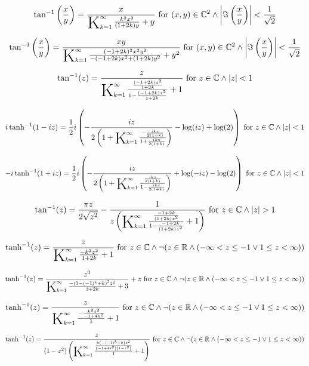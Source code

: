 \documentclass{article}
\newcommand{\bigK}{\mathop{\raisebox{-5pt}{\huge K}}}
\begin{document}
\[\tan ^{-1}\left(\frac{x}{y}\right)=\frac{x}{\bigK_{k=1}^{\infty}\frac{k^2 x^2}{(1+2 k) y}+y}\text{ for }(x,y)\in \mathbb{C}^2\land \left| \Im\left(\frac{x}{y}\right)\right| <\frac{1}{\sqrt{2}}\] 

\[\tan ^{-1}\left(\frac{x}{y}\right)=\frac{x y}{\bigK_{k=1}^{\infty}\frac{(-1+2 k)^2 x^2 y^2}{-(-1+2 k) x^2+(1+2 k) y^2}+y^2}\text{ for }(x,y)\in \mathbb{C}^2\land \left| \Im\left(\frac{x}{y}\right)\right| <\frac{1}{\sqrt{2}}\] 

\[\tan ^{-1}(z)=\frac{z}{\bigK_{k=1}^{\infty}\frac{\frac{(-1+2 k) z^2}{1+2 k}}{1-\frac{(-1+2 k) z^2}{1+2 k}}+1}\text{ for }z\in \mathbb{C}\land \left| z\right| <1\] 

\[i \tanh ^{-1}(1-i z)=\frac{1}{2} i \left(-\frac{i z}{2 \left(1+\bigK_{k=1}^{\infty}\frac{-\frac{i k z}{2 (1+k)}}{1+\frac{i k z}{2 (1+k)}}\right)}-\log (i z)+\log (2)\right)\text{ for }z\in \mathbb{C}\land \left| z\right| <1\] 

\[-i \tanh ^{-1}(1+i z)=\frac{1}{2} i \left(-\frac{i z}{2 \left(1+\bigK_{k=1}^{\infty}\frac{\frac{i k z}{2 (1+k)}}{1-\frac{i k z}{2 (1+k)}}\right)}+\log (-i z)-\log (2)\right)\text{ for }z\in \mathbb{C}\land \left| z\right| <1\] 

\[\tan ^{-1}(z)=\frac{\pi  z}{2 \sqrt{z^2}}-\frac{1}{z \left(\bigK_{k=1}^{\infty}\frac{\frac{-1+2 k}{(1+2 k) z^2}}{1-\frac{-1+2 k}{(1+2 k) z^2}}+1\right)}\text{ for }z\in \mathbb{C}\land \left| z\right| >1\] 

\[\tanh ^{-1}(z)=\frac{z}{\bigK_{k=1}^{\infty}\frac{-k^2 z^2}{1+2 k}+1}\text{ for }z\in \mathbb{C}\land \neg (z\in \mathbb{R}\land (-\infty <z\leq -1\lor 1\leq z<\infty ))\] 

\[\tanh ^{-1}(z)=\frac{z^3}{\bigK_{k=1}^{\infty}\frac{-\left(1-(-1)^k+k\right)^2 z^2}{3+2 k}+3}+z\text{ for }z\in \mathbb{C}\land \neg (z\in \mathbb{R}\land (-\infty <z\leq -1\lor 1\leq z<\infty ))\] 

\[\tanh ^{-1}(z)=\frac{z}{\bigK_{k=1}^{\infty}\frac{-\frac{k^2 z^2}{-1+4 k^2}}{1}+1}\text{ for }z\in \mathbb{C}\land \neg (z\in \mathbb{R}\land (-\infty <z\leq -1\lor 1\leq z<\infty ))\] 

\[\tanh ^{-1}(z)=\frac{z}{\left(1-z^2\right) \left(\bigK_{k=1}^{\infty}\frac{\frac{k \left(-(-1)^k+k\right) z^2}{\left(-1+4 k^2\right) \left(1-z^2\right)}}{1}+1\right)}\text{ for }z\in \mathbb{C}\land \neg (z\in \mathbb{R}\land (-\infty <z\leq -1\lor 1\leq z<\infty ))\] 
\end{document}
